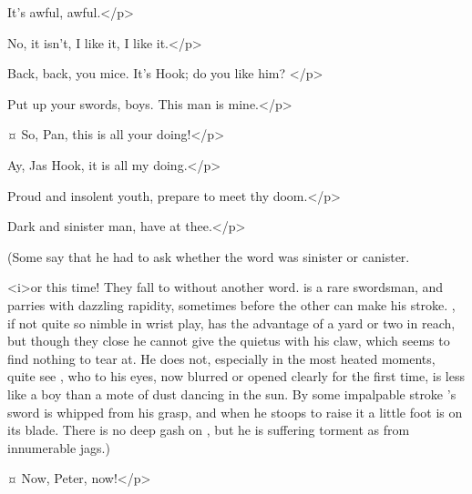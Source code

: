 \begin{drama}
\wendyspeaks
It's awful, awful.</p>

\michaelspeaks
No, it isn't, I like it, I like it.</p>


\hookspeaks
Back, back, you mice.
It's Hook; do you like him?
</p>

\peterspeaks
Put up your swords, boys.
This man is mine.</p>


\hookspeaks {}¤
So, Pan, this is all your doing!</p>

\peterspeaks
Ay, Jas Hook, it is all my doing.</p>

\hookspeaks
Proud and insolent youth, prepare to meet thy doom.</p>

\peterspeaks
Dark and sinister man, have at thee.</p>

\begin{stagedir}
(Some say that he had to ask \tootles whether the word was sinister or canister.

\hook <i>or \peter this time!
They fall to without another word.
\peter is a rare swordsman, and parries with dazzling rapidity, sometimes before the other can make his stroke.
\hook, if not quite so nimble in wrist play, has the advantage of a yard or two in reach, but though they close he cannot give the quietus with his claw, which seems to find nothing to tear at.
He does not, especially in the most heated moments, quite see \peter, who to his eyes, now blurred or opened clearly for the first time, is less like a boy than a mote of dust dancing in the sun.
By some impalpable stroke \hook's sword is whipped from his grasp, and when he stoops to raise it a little foot is on its blade.
There is no deep gash on \hook, but he is suffering torment as from innumerable jags.)
\end{stagedir}

 ¤
Now, Peter, now!</p>



\end{drama}
